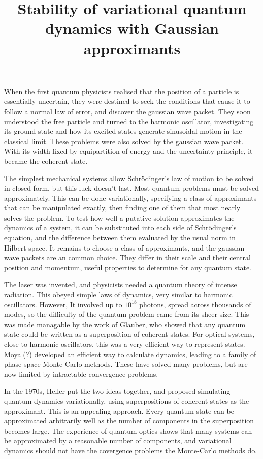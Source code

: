 \nonstopmode




\title{Stability of variational quantum dynamics with Gaussian approximants}


When the first quantum physicists realised that the position of a particle is essentially uncertain, they were destined to seek the conditions that cause it to follow a normal law of error, and discover the gaussian wave packet.  They soon understood the free particle and turned to the harmonic oscillator, investigating its ground state and how its excited states generate sinusoidal motion in the classical limit.  These problems were also solved by the gaussian wave packet.  With its width fixed by equipartition of energy and the uncertainty principle, it became the coherent state.

The simplest mechanical systems allow Schrödinger's law of motion to be solved in closed form, but this luck doesn't last.  Most quantum problems must be solved approximately.  This can be done variationally, specifying a class of approximants that can be manipulated exactly, then finding one of them that most nearly solves the problem.  To test how well a putative solution approximates the dynamics of a system, it can be substituted into each side of Schrödinger's equation, and the difference between them evaluated by the usual norm in Hilbert space.  It remains to choose a class of approximants, and the gaussian wave packets are an common choice.  They differ in their scale and their central position and momentum, useful properties to determine for any quantum state.

The laser was invented, and physicists needed a quantum theory of intense radiation.  This obeyed simple laws of dynamics, very similar to harmonic oscillators.  However, It involved up to $10^{18}$ photons, spread across thousands of modes, so the difficulty of the quantum problem came from its sheer size.  This was made managable by the work of Glauber, who showed that any quantum state could be written as a superposition of coherent states.  For optical systems, close to harmonic oscillators, this was a very efficient way to represent states.  Moyal(?) developed an efficient way to calculate dynamics, leading to a family of phase space Monte-Carlo methods.  These have solved many problems, but are now limited by intractable convergence problems.

In the 1970s, Heller put the two ideas together, and proposed simulating quantum dynamics variationally, using superpositions of coherent states as the approximant.  This is an appealing approach.  Every quantum state can be approximated arbitrarily well as the number of components in the superposition becomes large.  The experience of quantum optics shows that many systems can be approximated by a reasonable number of components, and variational dynamics should not have the covergence problems the Monte-Carlo methods do.

